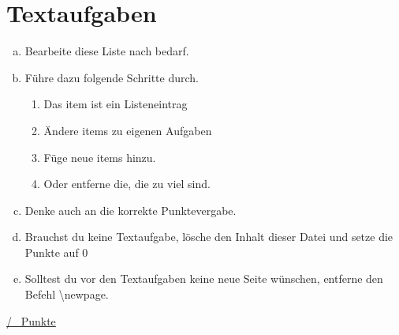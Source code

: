 \newpage
\section{Textaufgaben}
\begin{enumerate}[a)]
\item Bearbeite diese Liste nach bedarf.
\item Führe dazu folgende Schritte durch.
\begin{enumerate}[1.]
\item Das item ist ein Listeneintrag
\item Ändere items zu eigenen Aufgaben
\item Füge neue items hinzu.
\item Oder entferne die, die zu viel sind.
\end{enumerate}
\item Denke auch an die korrekte Punktevergabe.
\item Brauchst du keine Textaufgabe, lösche den Inhalt dieser Datei und setze die Punkte auf 0
\item Solltest du vor den Textaufgaben keine neue Seite wünschen, entferne den Befehl \textbackslash newpage.
\end{enumerate}
\begin{flushright}
\underline{\hspace{2cm}/ \punkte~Punkte}
\end{flushright}